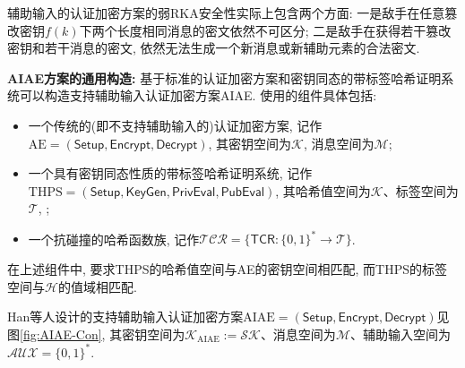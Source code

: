 

\begin{note}
辅助输入的认证加密方案的弱RKA安全性实际上包含两个方面: 一是敌手在任意篡改密钥$f(k)$下两个长度相同消息的密文依然不可区分; 二是敌手在获得若干篡改密钥和若干消息的密文, 依然无法生成一个新消息或新辅助元素的合法密文.
\end{note}

\medskip\noindent\textbf{AIAE方案的通用构造:} 基于标准的认证加密方案和密钥同态的带标签哈希证明系统可以构造支持辅助输入认证加密方案AIAE. 使用的组件具体包括:
\begin{itemize}
\item 一个传统的(即不支持辅助输入的)认证加密方案, 记作$\text{AE} = (\mathsf{Setup}, \mathsf{Encrypt}, \mathsf{Decrypt})$, 其密钥空间为$\mathcal{K}$, 消息空间为$\mathcal{M}$;

\item 一个具有密钥同态性质的带标签哈希证明系统, 记作$\text{THPS} = (\mathsf{Setup}, \mathsf{KeyGen}, \mathsf{PrivEval}, \mathsf{PubEval})$, 其哈希值空间为$\mathcal{K}$、标签空间为$\mathcal{T}$, ;

\item 一个抗碰撞的哈希函数族, 记作$\mathcal{TCR} = \{\textsf{TCR}: \{0, 1\}^* \rightarrow \mathcal{T} \}$.
\end{itemize}
在上述组件中, 要求THPS的哈希值空间与AE的密钥空间相匹配, 而THPS的标签空间与$\mathcal{H}$的值域相匹配.

Han等人设计的支持辅助输入认证加密方案$\text{AIAE} = (\mathsf{Setup}, \mathsf{Encrypt}, \mathsf{Decrypt})$见图\ref{fig:AIAE-Con}, 其密钥空间为$\mathcal{K}_{\text{AIAE}} := \mathcal{SK}$、消息空间为$\mathcal{M}$、辅助输入空间为$\mathcal{AUX} = \{0, 1\}^*$.

